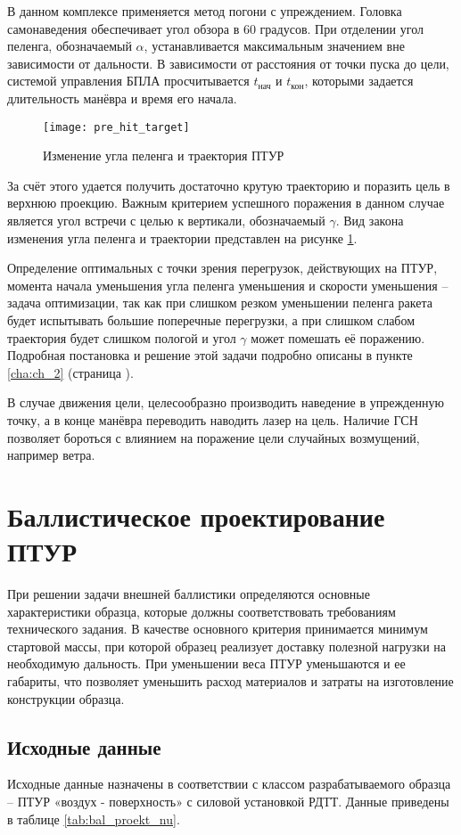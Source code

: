 В данном комплексе применяется метод погони с упреждением. Головка самонаведения обеспечивает угол обзора в 60 градусов. При отделении угол пеленга, обозначаемый $\alpha$, устанавливается максимальным значением вне зависимости от дальности. В зависимости от расстояния от точки пуска до цели, системой управления БПЛА просчитывается $t_{\text{нач}}$ и $t_{\text{кон}}$, которыми задается длительность манёвра и время его начала.
\begin{figure}[!h]
	\texttt{[image: pre\_hit\_target]}
	\caption{Изменение угла пеленга и траектория ПТУР}
	\label{fig:pre_hit_target}
\end{figure}

За счёт этого удается получить достаточно крутую траекторию и поразить цель в верхнюю проекцию. Важным критерием успешного поражения в данном случае является угол встречи с целью к вертикали, обозначаемый $\gamma$. Вид закона изменения угла пеленга и траектории представлен на рисунке \ref{fig:pre_hit_target}.

Определение оптимальных с точки зрения перегрузок, действующих на ПТУР, момента начала уменьшения угла пеленга уменьшения и скорости уменьшения – задача оптимизации, так как при слишком резком уменьшении пеленга ракета будет испытывать большие поперечные перегрузки, а при слишком слабом траектория будет слишком пологой и угол $\gamma$ может помешать её поражению. Подробная постановка и решение этой задачи подробно описаны в пункте \ref{cha:ch_2} (страница \pageref{cha:ch_2}).

В случае движения цели, целесообразно производить наведение в упрежденную точку, а в конце манёвра переводить наводить лазер на цель.
Наличие ГСН позволяет бороться с влиянием на поражение цели случайных возмущений, например ветра.

\clearpage
\section{Баллистическое проектирование ПТУР}
При решении задачи внешней баллистики определяются основные характеристики образца, которые должны соответствовать требованиям технического задания. В качестве основного критерия принимается минимум стартовой массы, при которой образец реализует доставку полезной нагрузки на необходимую дальность. При уменьшении веса ПТУР уменьшаются и ее габариты, что позволяет уменьшить расход материалов и затраты на изготовление конструкции образца.
\subsection{Исходные данные}
Исходные данные назначены в соответствии с классом разрабатываемого образца – ПТУР «воздух - поверхность» с силовой установкой РДТТ. Данные приведены в таблице \ref{tab:bal_proekt_nu}.

